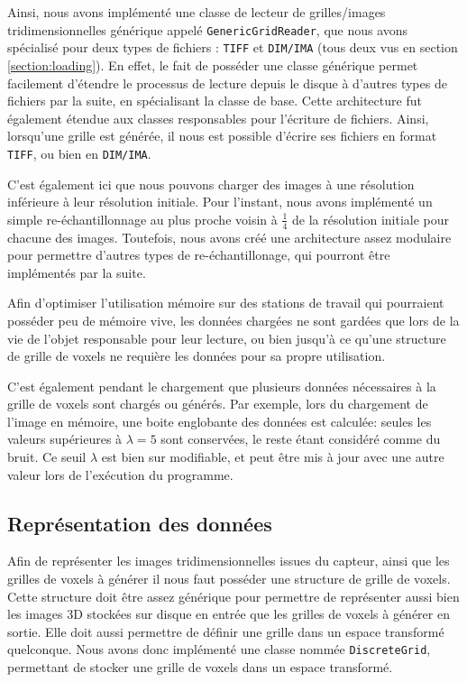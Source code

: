 {{{            Ainsi, nous avons implémenté une classe de lecteur de grilles/images tridimensionnelles générique appelé \texttt{GenericGridReader}, que nous avons spécialisé pour deux types de fichiers : \texttt{TIFF} et \texttt{DIM/IMA} (tous deux vus en section \ref{section:loading}). En effet, le fait de posséder une classe générique permet facilement d'étendre le processus de lecture depuis le disque à d'autres types de fichiers par la suite, en spécialisant la classe de base. Cette architecture fut également étendue aux classes responsables pour l'écriture de fichiers. Ainsi, lorsqu'une grille est générée, il nous est possible d'écrire ses fichiers en format \texttt{TIFF}, ou bien en \texttt{DIM/IMA}.
	        
            C'est également ici que nous pouvons charger des images à une résolution inférieure à leur résolution initiale. Pour l'instant, nous avons implémenté un simple re-échantillonnage au plus proche voisin à $\frac{1}{4}$ de la résolution initiale pour chacune des images. Toutefois, nous avons créé une architecture assez modulaire pour permettre d'autres types de re-échantillonage, qui pourront être implémentés par la suite.
	        
            Afin d'optimiser l'utilisation mémoire sur des stations de travail qui pourraient posséder peu de mémoire vive, les données chargées ne sont gardées que lors de la vie de l'objet responsable pour leur lecture, ou bien jusqu'à ce qu'une structure de grille de voxels ne requière les données pour sa propre utilisation.
            
            C'est également pendant le chargement que plusieurs données nécessaires à la grille de voxels sont chargés ou générés. Par exemple, lors du chargement de l'image en mémoire, une boite englobante des données est calculée: seules les valeurs supérieures à $\lambda=5$ sont conservées, le reste étant considéré comme du bruit. Ce seuil $\lambda$ est bien sur modifiable, et peut être mis à jour avec une autre valeur lors de l'exécution du programme.
        }

        \subsection{Représentation des données}
        {
            Afin de représenter les images tridimensionnelles issues du capteur, ainsi que les grilles de voxels à générer il nous faut posséder une structure de grille de voxels. Cette structure doit être assez générique pour permettre de représenter aussi bien les images 3D stockées sur disque en entrée que les grilles de voxels à générer en sortie. Elle doit aussi permettre de définir une grille dans un espace transformé quelconque. Nous avons donc implémenté une classe nommée \texttt{DiscreteGrid}, permettant de stocker une grille de voxels dans un espace transformé.

}}}
